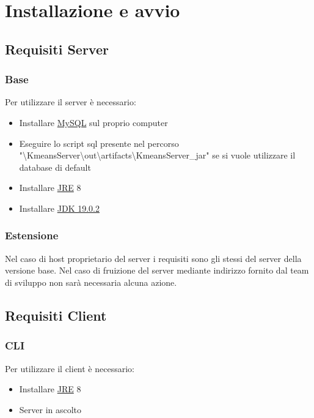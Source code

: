 \section{Installazione e avvio}
\subsection{Requisiti Server}
\subsubsection{Base}
\noindent Per utilizzare il server è necessario:
\begin{itemize}[label=-]
  \item Installare \href{https://dev.mysql.com/downloads/installer/}{MySQL} sul proprio computer
  \item Eseguire lo script sql presente nel percorso "\textbackslash KmeansServer\textbackslash out\textbackslash artifacts\textbackslash KmeansServer\_jar" se si vuole utilizzare il database di default
  \item Installare \href{https://www.oracle.com/technetwork/java/javase/downloads/jre8-downloads-2133155.html}{JRE} 8
  \item Installare \href{https://www.oracle.com/java/technologies/javase/jdk19-archive-downloads.html}{JDK 19.0.2}
\end{itemize}

\subsubsection{Estensione}
\noindent Nel caso di host proprietario del server i requisiti sono gli stessi del server della versione base. Nel caso di fruizione del server mediante indirizzo fornito dal team di sviluppo non sarà necessaria alcuna azione.

\subsection{Requisiti Client}
\subsubsection{CLI}
\noindent Per utilizzare il client è necessario:
\begin{itemize}[label=-]
  \item Installare \href{https://www.oracle.com/technetwork/java/javase/downloads/jre8-downloads-2133155.html}{JRE} 8  
  \item Server in ascolto
\end{itemize}

